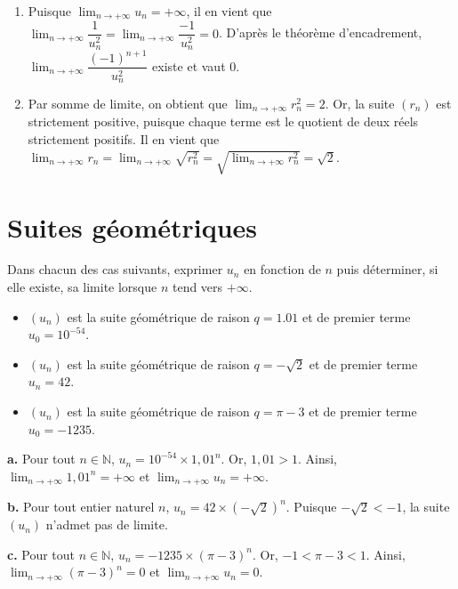 \documentclass[11pt,fleqn, openany]{book} %
\begin{document}
\begin{solution}
\begin{enumerate}
\begin{enumerate}
\item Puisque \(\displaystyle\lim_{n\to+\infty}u_n=+\infty\), il en vient que \(\displaystyle\lim_{n\to+\infty}\dfrac{1}{u_n^2}=\displaystyle\lim_{n\to+\infty}\dfrac{-1}{u_n^2}=0\). D'après le théorème d'encadrement, \(\displaystyle\lim_{n\to+\infty}\dfrac{(-1)^{n+1}}{u_n^2}\) existe et vaut 0.

 \item Par somme de limite, on obtient que \(\displaystyle\lim_{n\to+\infty}r_n^2=2\). Or, la suite \((r_n)\) est strictement positive, puisque chaque terme est le quotient de deux réels strictement positifs. Il en vient que $\displaystyle\lim_{n\to+\infty}r_n = \displaystyle\lim_{n\to+\infty}\sqrt{r_n^2}=\sqrt{\displaystyle\lim_{n\to+\infty}r_n^2}=\sqrt{2}$.\end{enumerate}\end{enumerate}
 \end{solution}
 


\section*{Suites géométriques}

\begin{exercise}[topic=lim12]Dans chacun des cas suivants, exprimer $u_n$ en fonction de $n$ puis déterminer, si elle existe, sa limite lorsque $n$ tend vers $+\infty$.

\begin{itemize}
\item $ (u_n)$ est la suite géométrique de raison $q=1.01$ et de premier terme $u_0=10^{-54}$.
\item $(u_n)$ est la suite géométrique de raison $q=-\sqrt{2}$ et de premier terme $u_n=42$.
\item $ (u_n)$ est la suite géométrique de raison $q=\pi-3$ et de premier terme $u_0=-1235$.\end{itemize}
\end{exercise}
\begin{solution}\textbf{a.} Pour tout $n\in\mathbb{N}$, $u_n=10^{-54} \times 1,01 ^n$. Or, $1,01>1$. Ainsi, $\displaystyle \lim_{n \to +\infty} 1,01^n= +\infty$ et $\displaystyle \lim_{n \to +\infty} u_n = +\infty$.

\textbf{b.} Pour tout entier naturel $n$, $u_n=42 \times (-\sqrt{2})^n$. Puisque $-\sqrt{2}<-1$, la suite $(u_n)$ n'admet pas de limite.

\textbf{c.} Pour tout $n\in\mathbb{N}$, $u_n = -1235 \times (\pi-3)^n$. Or, $-1<\pi-3<1$. Ainsi, $\displaystyle \lim_{n\to+\infty}(\pi-3)^n=0$ et $\displaystyle \lim_{n\to+\infty}u_n=0$.\end{solution}
\end{document}
